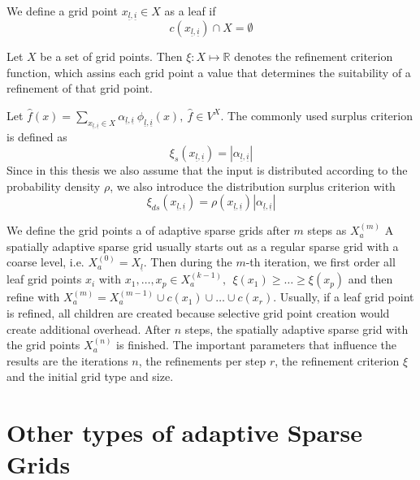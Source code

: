 \documentclass[
  a4paper,  %
  twoside,  %
  bibliography=totoc,
  headsepline,
  cleardoublepage=empty,
  parskip=half,
  draft=false
]{scrbook}
\begin{document}
\begin{definition}
We define a grid point $x_{\underline{l},\underline{i}} \in X$ as a leaf if
\begin{equation}
c(x_{\underline{l},\underline{i}}) \cap X = \emptyset
\end{equation}
\end{definition}
\begin{definition}
Let $X$ be a set of grid points.
Then $\xi \colon X \mapsto \mathds{R}$ denotes the refinement criterion function, which assins each grid point a value that determines the suitability of a refinement of that grid point.

Let $\hat{f}(x) = \sum_{x_{\underline{l},\underline{i}} \in X} \alpha_{\underline{l},\underline{i}} ~ \phi_{
\underline{l},\underline{i}}(x), ~\hat{f} \in V^X$.
The commonly used surplus criterion is defined as
\begin{equation}
\xi_s(x_{\underline{l},\underline{i}}) = |\alpha_{\underline{l},\underline{i}}|
\end{equation}
Since in this thesis we also assume that the input is distributed according to the probability density $\rho$, we also introduce the distribution surplus criterion with
\begin{equation}
\xi_{ds}(x_{\underline{l},\underline{i}}) =\rho(x_{\underline{l},\underline{i}}) |\alpha_{\underline{l},\underline{i}}|
\end{equation}
\end{definition}
We define the grid points a of adaptive sparse grids after $m$ steps as $X_a^{(m)}$
A spatially adaptive sparse grid usually starts out as a regular sparse grid with a coarse level, i.e. $X_a^{(0)}=X_{\underline{l}}$.
Then during the $m$-th iteration, we first order all leaf grid points $x_i$ with $x_1, \dots, x_p \in X_a^{(k-1)}, ~~ \xi(x_1) \geq \dots \geq \xi(x_p)$ and then refine with $X_a^{(m)}=X_a^{(m-1)} \cup c(x_1) \cup \dots \cup c(x_r)$.
Usually, if a leaf grid point is refined, all children are created because selective grid point creation would create additional overhead.
After $n$ steps, the spatially adaptive sparse grid with the grid points $X_a^{(n)}$ is finished.
The important parameters that influence the results are the iterations $n$, the refinements per step $r$, the refinement criterion $\xi$ and the initial grid type and size.

\section{Other types of adaptive Sparse Grids}
\end{document}
